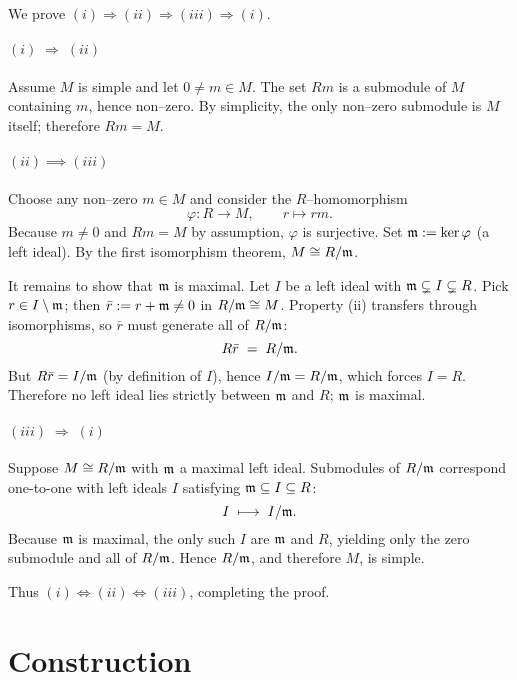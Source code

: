 \begin{prf}
    We prove $(i)\Rightarrow(ii)\Rightarrow(iii)\Rightarrow(i)$.

\paragraph{\boldmath$(i)\;\Rightarrow\;(ii)$}
Assume $M$ is simple and let $0\neq m\in M$.  
The set $Rm$ is a submodule of $M$ containing $m$, hence non–zero.  
By simplicity, the only non–zero submodule is $M$ itself; therefore $Rm=M$.

\paragraph{$(ii)\implies(iii)$}
Choose any non–zero $m\in M$ and consider the $R$–homomorphism
\[
    \varphi:R\longrightarrow M,\qquad r\longmapsto r m .
\]
Because $m\neq0$ and $Rm=M$ by assumption, $\varphi$ is surjective.  
Set $\frak m := \ker\varphi$ (a left ideal).  By the first isomorphism theorem,
$M\cong R/\frak m$.

It remains to show that $\frak m$ is maximal.  
Let $I$ be a left ideal with $\frak m\subsetneq I\subsetneq R$.  
Pick $r\in I\setminus\frak m$; then $\bar r:=r+\frak m\neq0$ in $R/\frak m\cong M$.  
Property (ii) transfers through isomorphisms, so $\bar r$ must generate all of
$R/\frak m$: 
\[
    R\bar r \;=\; R/\frak m .
\]
But $R\bar r = I/\frak m$ (by definition of $I$), hence $I/\frak m = R/\frak m$,
which forces $I=R$.  Therefore no left ideal lies strictly between $\frak m$ and
$R$; $\frak m$ is maximal.

\paragraph{\boldmath$(iii)\;\Rightarrow\;(i)$}
Suppose $M\cong R/\frak m$ with $\frak m$ a maximal left ideal.  
Submodules of $R/\frak m$ correspond one-to-one with left ideals $I$ satisfying
$\frak m\subseteq I\subseteq R$:
\[
    I\;\longmapsto\; I/\frak m .
\]
Because $\frak m$ is maximal, the only such $I$ are $\frak m$ and $R$,
yielding only the zero submodule and all of $R/\frak m$.  Hence $R/\frak m$,
and therefore $M$, is simple.

\smallskip
Thus $(i)\Leftrightarrow(ii)\Leftrightarrow(iii)$, completing the proof.
\end{prf}

\section{Construction}

